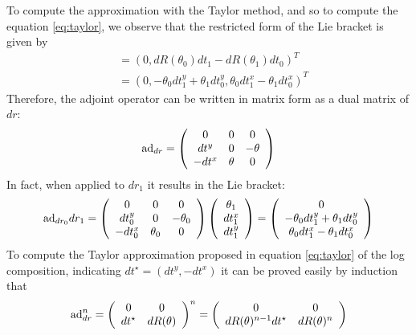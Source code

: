 To compute the approximation with the Taylor method, and so to compute the equation \ref{eq:taylor}, we observe that the restricted form of the Lie bracket is given by
\begin{align*}
[dr_0, dr_1] &= (0, dR(\theta_0)dt_1 - dR(\theta_1)dt_0)^T \\
& = (0, -\theta_0 dt^{y}_1 + \theta_1 dt^{y}_0 ,  \theta_0 dt^{x}_1 - \theta_1 dt^{x}_0)^T
\end{align*} 
Therefore, the adjoint operator can be written in matrix form as a dual matrix of $dr$:
\begin{align*}
\text{ad}_{dr} = 
\left (
\begin{array} {c c c}
0            &  0        &      0\\
dt^y       &  0        & - \theta \\
- dt^x   & \theta &  0
\end{array}
\right )
\end{align*} 
In fact, when applied to $dr_1$ it results in the Lie bracket:
\begin{align*}
\text{ad}_{dr_0} dr_1= 
\left (
\begin{array} {c c c}
0            &  0        &      0\\
dt^{y}_0       &  0        & - \theta_0 \\
- dt^{x}_0   & \theta_0 &  0
\end{array}
\right )
\left (
\begin{array} {c }
\theta_1   \\
dt^{x}_1   \\
dt^{y}_1 
\end{array}
\right )
=
\left (
\begin{array} {c }
0  \\
-\theta_0 dt^{y}_1+ \theta_1 dt^{y}_0\\ 
 \theta_0 dt^{x}_1- \theta_1 dt^{x}_0
\end{array}
\right )
\end{align*} 
To compute the Taylor approximation proposed in equation \ref{eq:taylor} of the log composition, indicating $dt^{\star} = (dt^{y}, - dt^{x})$ it can be proved easily by induction that
\begin{align*}
\text{ad}_{dr}^{n} 
= 
\left (
\begin{array} {c c}
0            &  0        \\
dt^{\star}      &  dR(\theta)      
\end{array}
\right )^n
=
\left (
\begin{array} {c c}
0            &  0        \\
dR(\theta)^{n-1}dt^{\star}      &  dR(\theta)^{n}      
\end{array}
\right )
\end{align*}
